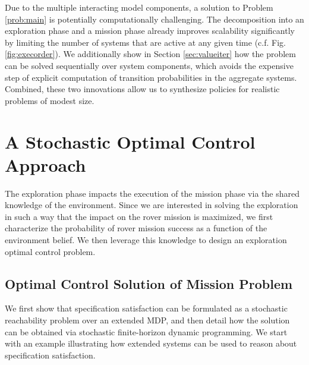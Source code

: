 \documentclass[conference]{IEEEtran}
\begin{document}
\smallskip
{} Due to the multiple interacting model components, a solution to Problem \ref{prob:main} is potentially computationally challenging. The decomposition into an exploration phase and a mission phase already improves scalability significantly by limiting the number of systems that are active at any given time (c.f. Fig. \ref{fig:execorder}). We additionally show in Section \ref{sec:valueiter} how the problem can be solved sequentially over system components, which avoids the expensive step of explicit computation of transition probabilities in the aggregate systems. Combined, these two innovations allow us to synthesize policies for realistic problems of modest size.


\section{A Stochastic Optimal Control Approach}
\label{sec:stochopt}

The exploration phase impacts the execution of the mission phase via the shared knowledge of the environment. Since we are interested in solving the exploration in such a way that the impact on the rover mission is maximized, we first characterize the probability of rover mission success as a function of the environment belief. We then leverage this knowledge to design an exploration optimal control problem.

\subsection{Optimal Control Solution of Mission Problem}

We first show that specification satisfaction can be formulated as a stochastic reachability problem over an extended MDP, and then detail how the solution can be obtained via stochastic finite-horizon dynamic programming. We start with an example illustrating how extended systems can be used to reason about specification satisfaction.
\end{document}
